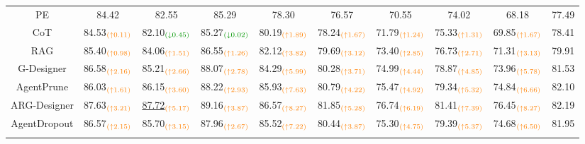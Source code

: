 \documentclass[lettersize,journal]{IEEEtran}
\theoremstyle{plain}
\begin{document}
\begin{table}[!t]
\begin{tabular}{cccccccccc}
PE & 84.42 & 82.55 & 85.29 & 78.30 & 76.57 & 70.55 & 74.02 & 68.18 & 77.49 \\
CoT & 84.53$_{\textcolor{orange}{(\uparrow 0.11)}}$ & 82.10$_{\textcolor{mygreen}{(\downarrow 0.45)}}$ & 85.27$_{\textcolor{mygreen}{(\downarrow 0.02)}}$ & 80.19$_{\textcolor{orange}{(\uparrow 1.89)}}$ & 78.24$_{\textcolor{orange}{(\uparrow 1.67)}}$ & 71.79$_{\textcolor{orange}{(\uparrow 1.24)}}$ & 75.33$_{\textcolor{orange}{(\uparrow 1.31)}}$ & 69.85$_{\textcolor{orange}{(\uparrow 1.67)}}$ & 78.41 \\
RAG & 85.40$_{\textcolor{orange}{(\uparrow 0.98)}}$ & 84.06$_{\textcolor{orange}{(\uparrow 1.51)}}$ & 86.55$_{\textcolor{orange}{(\uparrow 1.26)}}$ & 82.12$_{\textcolor{orange}{(\uparrow 3.82)}}$ & 79.69$_{\textcolor{orange}{(\uparrow 3.12)}}$ & 73.40$_{\textcolor{orange}{(\uparrow 2.85)}}$ & 76.73$_{\textcolor{orange}{(\uparrow 2.71)}}$ & 71.31$_{\textcolor{orange}{(\uparrow 3.13)}}$ & 79.91 \\ \hdashline
G-Designer & 86.58$_{\textcolor{orange}{(\uparrow 2.16)}}$ & 85.21$_{\textcolor{orange}{(\uparrow 2.66)}}$ & 88.07$_{\textcolor{orange}{(\uparrow 2.78)}}$ & 84.29$_{\textcolor{orange}{(\uparrow 5.99)}}$ & 80.28$_{\textcolor{orange}{(\uparrow 3.71)}}$ & 74.99$_{\textcolor{orange}{(\uparrow 4.44)}}$ & 78.87$_{\textcolor{orange}{(\uparrow 4.85)}}$ & 73.96$_{\textcolor{orange}{(\uparrow 5.78)}}$ & 81.53 \\
AgentPrune & 86.03$_{\textcolor{orange}{(\uparrow 1.61)}}$ & 86.15$_{\textcolor{orange}{(\uparrow 3.60)}}$ & 88.22$_{\textcolor{orange}{(\uparrow 2.93)}}$ & 85.93$_{\textcolor{orange}{(\uparrow 7.63)}}$ & 80.79$_{\textcolor{orange}{(\uparrow 4.22)}}$ & 75.47$_{\textcolor{orange}{(\uparrow 4.92)}}$ & 79.34$_{\textcolor{orange}{(\uparrow 5.32)}}$ & 74.84$_{\textcolor{orange}{(\uparrow 6.66)}}$ & 82.10 \\
ARG-Designer & 87.63$_{\textcolor{orange}{(\uparrow 3.21)}}$ & \underline{87.72}$_{\textcolor{orange}{(\uparrow 5.17)}}$ & 89.16$_{\textcolor{orange}{(\uparrow 3.87)}}$ & 86.57$_{\textcolor{orange}{(\uparrow 8.27)}}$ & 81.85$_{\textcolor{orange}{(\uparrow 5.28)}}$ & 76.74$_{\textcolor{orange}{(\uparrow 6.19)}}$ & 81.41$_{\textcolor{orange}{(\uparrow 7.39)}}$ & 76.45$_{\textcolor{orange}{(\uparrow 8.27)}}$ & 82.19 \\
AgentDropout & 86.57$_{\textcolor{orange}{(\uparrow 2.15)}}$ & 85.70$_{\textcolor{orange}{(\uparrow 3.15)}}$ & 87.96$_{\textcolor{orange}{(\uparrow 2.67)}}$ & 85.52$_{\textcolor{orange}{(\uparrow 7.22)}}$ & 80.44$_{\textcolor{orange}{(\uparrow 3.87)}}$ & 75.30$_{\textcolor{orange}{(\uparrow 4.75)}}$ & 79.39$_{\textcolor{orange}{(\uparrow 5.37)}}$ & 74.68$_{\textcolor{orange}{(\uparrow 6.50)}}$ & 81.95 \\ \hdashline

\end{tabular}
\end{table}
\end{document}
